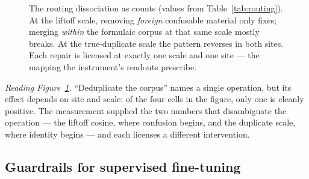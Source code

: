 \documentclass[11pt,letterpaper]{article}
\begin{document}
\begin{figure}[t]
\centering
{}
\caption{The routing dissociation as counts (values from
Table~\ref{tab:routing}). At the liftoff scale, removing \emph{foreign}
confusable material only fixes; merging \emph{within} the formulaic corpus
at that same scale mostly breaks. At the true-duplicate scale the pattern
reverses in both sites. Each repair is licensed at exactly one scale and
one site --- the mapping the instrument's readouts prescribe.}
\label{fig:routingfig}
\end{figure}

\emph{Reading Figure~\ref{fig:routingfig}.} ``Deduplicate the corpus''
names a single operation, but its effect depends on site and scale: of the
four cells in the figure, only one is cleanly positive. The measurement
supplied the two numbers that disambiguate the operation --- the liftoff
cosine, where confusion begins, and the duplicate scale, where identity
begins --- and each licenses a different intervention.

\subsection{Guardrails for supervised fine-tuning}
\label{sec:guardrail}
\end{document}
